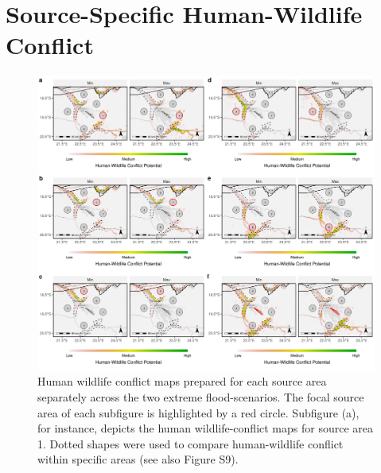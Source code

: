 \documentclass[abstract=on,10pt,a4paper,bibliography=totocnumbered]{article}
\begin{document}
\section{Source-Specific Human-Wildlife Conflict}
\begin{figure}[htbp]
  \begin{center}
  \includegraphics[width = \textwidth]{Figures/HumanWildlifeConflictIndividual.png}
  \caption{Human wildlife conflict maps prepared for each source area separately
  across the two extreme flood-scenarios. The focal source area of each
  subfigure is highlighted by a red circle. Subfigure (a), for instance, depicts
  the human wildlife-conflict maps for source area 1. Dotted shapes were used to
  compare human-wildlife conflict within specific areas (see also Figure S9).}
  \label{HWC}
  \end{center}
\end{figure}

\newpage
\end{document}
